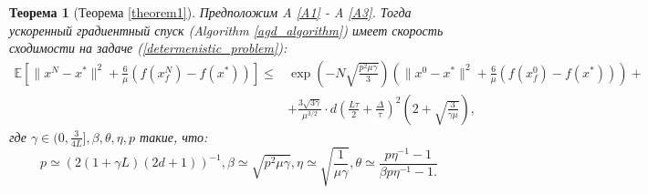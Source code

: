 \documentclass{article}
\newtheorem{theorem}{Теорема}
\begin{document}
\begin{theorem}[Теорема \ref{theorem1}]\label{theorem1_appendix}
Предположим A \ref{A1} - A \ref{A3}. Тогда ускоренный градиентный спуск (Algorithm \ref{agd_algorithm}) имеет скорость сходимости на задаче (\ref{determenistic_problem}):
\begin{align}
    \mathbb{E}\left[\|x^N - x^*\|^2 + \frac{6}{\mu} (f(x_f^N) - f(x^*))\right] \leqslant& \exp\left(- N\sqrt{\frac{p^2\mu\gamma}{3}}\right) \left(\|x^0 - x^*\|^2 + \frac{6}{\mu} (f(x_f^0) - f(x^*))\right) +\\
    &+\frac{3 \sqrt{3\gamma}}{\mu^{3/2}} \cdot d \left(\frac{L\tau}{2} + \frac{\Delta}{\tau}\right)^2\left(2 + \sqrt{\frac{3}{\gamma\mu}}\right),
   \label{deterministic_convergence_appendix}
\end{align}
где $\gamma \in (0, \frac{3}{4L}], \beta, \theta, \eta, p$ такие, что:
\begin{equation}
   p \simeq (2(1 + \gamma L)(2d + 1))^{-1}, \beta \simeq \sqrt{p^2 \mu \gamma}, \eta \simeq \sqrt{\frac{1}{\mu\gamma}}, \theta \simeq \frac{p \eta^{-1} - 1}{\beta p \eta^{-1} - 1.}
\end{equation}
\end{theorem}
\end{document}
